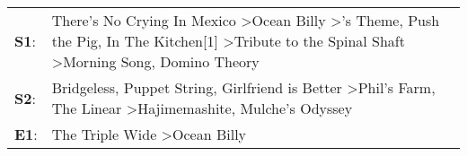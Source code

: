 \begin{supertabular}{p{0.03\textwidth}p{0.92\textwidth}}
 \textbf{S1}:  &  There's No Crying In Mexico\textsuperscript{} \textgreater \enspace Ocean Billy\textsuperscript{} \textgreater {}'s Theme\textsuperscript{}, \enspace Push the Pig\textsuperscript{}, \enspace In The Kitchen[1]\textsuperscript{} \textgreater \enspace Tribute to the Spinal Shaft\textsuperscript{} \textgreater \enspace Morning Song\textsuperscript{}, \enspace Domino Theory\textsuperscript{}  \enspace  \\
 \textbf{S2}:  &                                                                                           Bridgeless\textsuperscript{}, \enspace Puppet String\textsuperscript{}, \enspace Girlfriend is Better\textsuperscript{} \textgreater \enspace Phil's Farm\textsuperscript{}, \enspace The Linear\textsuperscript{} \textgreater \enspace Hajimemashite\textsuperscript{}, \enspace Mulche's Odyssey\textsuperscript{}  \enspace  \\
 \textbf{E1}:  &                                                                                                                                                                                                                                                                                                                           The Triple Wide\textsuperscript{} \textgreater \enspace Ocean Billy\textsuperscript{}  \enspace  \\
\end{supertabular}
